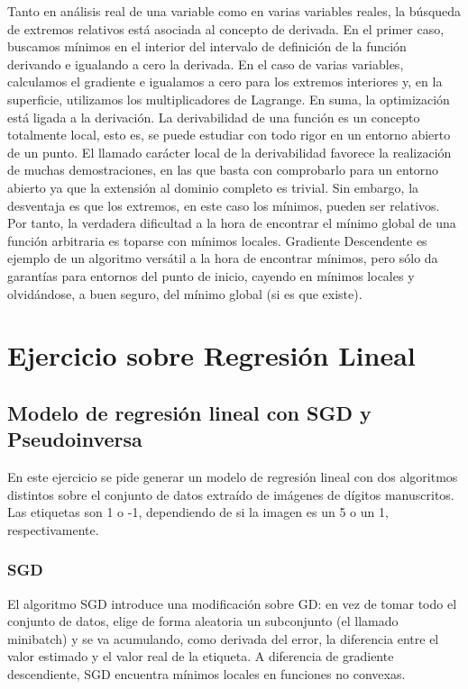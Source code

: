 Tanto en análisis real de una variable como en varias variables reales, la búsqueda de extremos relativos está asociada al concepto de derivada. En el primer caso, buscamos mínimos en el interior del intervalo de definición de la función derivando e igualando a cero la derivada. En el caso de varias variables, calculamos el gradiente e igualamos a cero para los extremos interiores y, en la superficie, utilizamos los multiplicadores de Lagrange. En suma, la optimización está ligada a la derivación. La derivabilidad de una función es un concepto totalmente local, esto es, se puede estudiar con todo rigor en un entorno abierto de un punto. El llamado carácter local de la derivabilidad favorece la realización de muchas demostraciones, en las que basta con comprobarlo para un entorno abierto ya que la extensión al dominio completo es trivial. Sin embargo, la desventaja es que los extremos, en este caso los mínimos, pueden ser relativos. Por tanto, la verdadera dificultad a la hora de encontrar el mínimo global de una función arbitraria es toparse con mínimos locales. Gradiente Descendente es ejemplo de un algoritmo versátil a la hora de encontrar mínimos, pero sólo da garantías para entornos del punto de inicio, cayendo en mínimos locales y olvidándose, a buen seguro, del mínimo global (si es que existe).

\section{Ejercicio sobre Regresión Lineal}

\subsection{Modelo de regresión lineal con SGD y Pseudoinversa}

En este ejercicio se pide generar un modelo de regresión lineal con dos algoritmos distintos sobre el conjunto de datos extraído de imágenes de dígitos manuscritos. Las etiquetas son 1 o -1, dependiendo de si la imagen es un 5 o un 1, respectivamente.

\subsubsection{SGD}

El algoritmo SGD introduce una modificación sobre GD: en vez de tomar todo el conjunto de datos, elige de forma aleatoria un subconjunto (el llamado minibatch) y se va acumulando, como derivada del error, la diferencia entre el valor estimado y el valor real de la etiqueta. A diferencia de gradiente descendiente, SGD encuentra mínimos locales en funciones no convexas. \\

